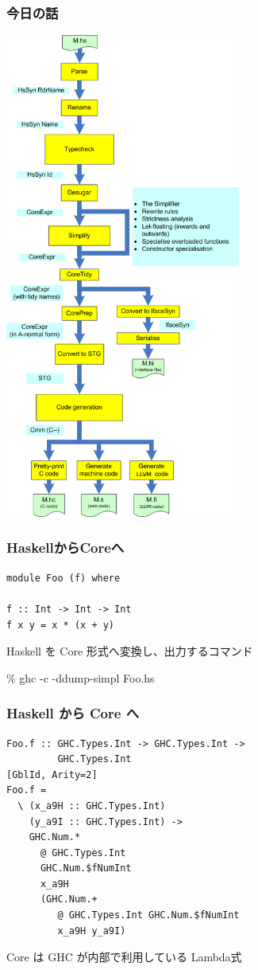 \documentclass[cjk,dvipdfm,14pt]{beamer}
\begin{document}
\begin{frame}[fragile]
\frametitle{今日の話}

\includegraphics[height=16cm]{./HscPipe2.png}

\end{frame}

\begin{frame}[fragile]
\frametitle{HaskellからCoreへ}

\begin{lstlisting}
module Foo (f) where

f :: Int -> Int -> Int
f x y = x * (x + y)
\end{lstlisting}

\hrulefill

Haskell を Core 形式へ変換し、出力するコマンド

\% ghc -c -ddump-simpl Foo.hs

\end{frame}

\begin{frame}[fragile]
\frametitle{Haskell から Core へ}

\begin{lstlisting}
Foo.f :: GHC.Types.Int -> GHC.Types.Int ->
         GHC.Types.Int
[GblId, Arity=2]
Foo.f =
  \ (x_a9H :: GHC.Types.Int)
    (y_a9I :: GHC.Types.Int) ->
    GHC.Num.*
      @ GHC.Types.Int
      GHC.Num.$fNumInt
      x_a9H
      (GHC.Num.+
         @ GHC.Types.Int GHC.Num.$fNumInt
         x_a9H y_a9I)

\end{lstlisting}

\hrulefill

Core は GHC が内部で利用している Lambda式

\end{frame}
\end{document}
